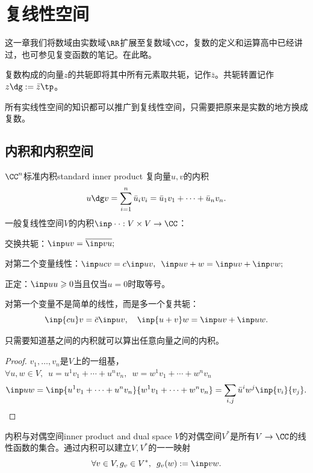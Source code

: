 \chapter{复线性空间}
\label{chap:complex linear space}

这一章我们将数域由实数域$\RR$扩展至复数域$\CC$，复数的定义和运算高中已经讲过，也可参见复变函数的笔记。在此略。

复数构成的向量$z$的共轭即将其中所有元素取共轭，记作$\bar z$。共轭转置记作$z\dg:=\bar z\tp$。

所有实线性空间的知识都可以推广到复线性空间，只需要把原来是实数的地方换成复数。
\section{内积和内积空间}
\begin{definition}{$\CC^n$标准内积}{standard inner product}
	复向量$u,v$的内积
	\[
		u\dg v=\sum_{i=1}^n\bar u_iv_i=\bar u_1v_1+\cdots+\bar u_nv_n.
	\]
	\tcblower
	一般复线性空间$V$的内积$\inp\cdot\cdot:V\times V\to\CC$：
	\begin{compactitem}
		\item 交换共轭：$\inp uv=\overline{\inp vu};$
		\item 对第二个变量线性：$\inp u{cv}=c\inp uv,\enspace \inp u{v+w}=\inp uv+\inp vw;$
		\item 正定：$\inp uu\geqslant 0$当且仅当$u=0$时取等号。
	\end{compactitem}
\end{definition}
\begin{remark}
	对第一个变量不是简单的线性，而是多一个复共轭：
	\[
		\inp{cu}v=\bar c\inp uv,\quad \inp{u+v}w=\inp uv+\inp uw.
	\]
\end{remark}
\begin{theorem}{}{}
	只需要知道基之间的内积就可以算出任意向量之间的内积。
\end{theorem}
\begin{proof}
	$v_1,\ldots,v_n$是$V$上的一组基，%
	$\forall u,w\in V,\enspace u=u^1v_1+\cdots+u^nv_n,\enspace w=w^1v_1+\cdots+w^nv_n$
	\[
		\inp uw=\inp{u^1v_1+\cdots+u^nv_n}{w^1v_1+\cdots+w^nv_n}=\sum_{i,j}\bar u^iw^j\inp{v_i}{v_j}.
		\qedhere
	\]
\end{proof}
\begin{example}{内积与对偶空间}{inner product and dual space}
	$V$的对偶空间$V^\ast$是所有$V\to\CC$的线性函数的集合。通过内积可以建立$V,V^\ast$的一一映射
	\[
		\forall v\in V,g_v\in V^\ast,\enspace g_v(w):=\inp vw
.	\]
\end{example}

